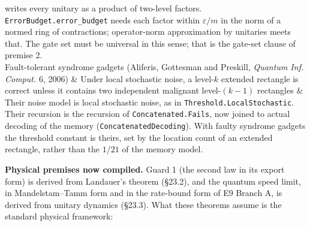 \documentclass[
]{article}
\begin{document}
{\begin{longtable}[]
writes every unitary as a product of two-level factors.
\texttt{E\allowbreak{}r\allowbreak{}r\allowbreak{}o\allowbreak{}r\allowbreak{}B\allowbreak{}u\allowbreak{}d\allowbreak{}g\allowbreak{}e\allowbreak{}t\allowbreak{}.\allowbreak{}e\allowbreak{}r\allowbreak{}r\allowbreak{}o\allowbreak{}r\allowbreak{}\_\allowbreak{}b\allowbreak{}u\allowbreak{}d\allowbreak{}g\allowbreak{}e\allowbreak{}t}
needs each factor within \(\varepsilon/m\) in the norm of a normed ring
of contractions; operator-norm approximation by unitaries meets that.
The gate set must be universal in this sense; that is the gate-set
clause of premise 2. \\
Fault-tolerant syndrome gadgets (Aliferis, Gottesman and Preskill,
\emph{Quantum Inf. Comput.} 6, 2006) & Under local stochastic noise, a
level-\(k\) extended rectangle is correct unless it contains two
independent malignant level-\((k-1)\) rectangles & Their noise model is
local stochastic noise, as in
\texttt{T\allowbreak{}h\allowbreak{}r\allowbreak{}e\allowbreak{}s\allowbreak{}h\allowbreak{}o\allowbreak{}l\allowbreak{}d\allowbreak{}.\allowbreak{}L\allowbreak{}o\allowbreak{}c\allowbreak{}a\allowbreak{}l\allowbreak{}S\allowbreak{}t\allowbreak{}o\allowbreak{}c\allowbreak{}h\allowbreak{}a\allowbreak{}s\allowbreak{}t\allowbreak{}i\allowbreak{}c}.
Their recursion is the recursion of
\texttt{C\allowbreak{}o\allowbreak{}n\allowbreak{}c\allowbreak{}a\allowbreak{}t\allowbreak{}e\allowbreak{}n\allowbreak{}a\allowbreak{}t\allowbreak{}e\allowbreak{}d\allowbreak{}.\allowbreak{}F\allowbreak{}a\allowbreak{}i\allowbreak{}l\allowbreak{}s},
now joined to actual decoding of the memory
(\texttt{C\allowbreak{}o\allowbreak{}n\allowbreak{}c\allowbreak{}a\allowbreak{}t\allowbreak{}e\allowbreak{}n\allowbreak{}a\allowbreak{}t\allowbreak{}e\allowbreak{}d\allowbreak{}D\allowbreak{}e\allowbreak{}c\allowbreak{}o\allowbreak{}d\allowbreak{}i\allowbreak{}n\allowbreak{}g}).
With faulty syndrome gadgets the threshold constant is theirs, set by
the location count of an extended rectangle, rather than the \(1/21\) of
the memory model. \\
\end{longtable}
}

\textbf{Physical premises now compiled.} Guard 1 (the second law in its
export form) is derived from Landauer's theorem (§23.2), and the quantum
speed limit, in Mandelstam--Tamm form and in the rate-bound form of E9
Branch A, is derived from unitary dynamics (§23.3). What these theorems
assume is the standard physical framework:
\end{document}
